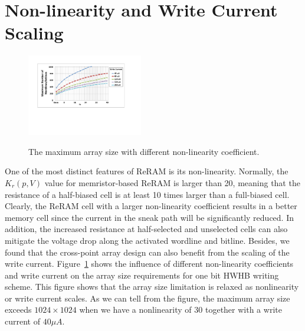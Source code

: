 \section{Non-linearity and Write Current Scaling}\label{sec:scale}
\begin{figure}[!b]
\centering
  \includegraphics[width=0.45\textwidth]{./figures/non_linear_f}\\
  \caption{The maximum array size with different non-linearity coefficient.}\label{fig:non_linear}
\end{figure}
One of the most distinct features of ReRAM is its non-linearity. Normally,
the $K_r(p,V)$ value for memristor-based ReRAM is larger than 20, meaning
that the resistance of a half-biased cell is at least 10 times larger than
a full-biased cell. Clearly, the ReRAM cell with a larger non-linearity
coefficient results in a better memory cell since the current in the sneak
path will be significantly reduced. In addition, the increased resistance
at half-selected and unselected cells can also mitigate the voltage drop
along the activated wordline and bitline. Besides, we found that the
cross-point array design can also benefit from the scaling of the write
current. Figure~\ref{fig:non_linear} shows the influence of different
non-linearity coefficients and write current on the array size
requirements for one bit HWHB writing scheme. This figure shows that the array size limitation is relaxed as nonlinearity or write current scales. As we can tell from the figure, the maximum array size exceeds $1024\times 1024$ when we have a nonlinearity of $30$ together with a write current of $40\mu A$.

